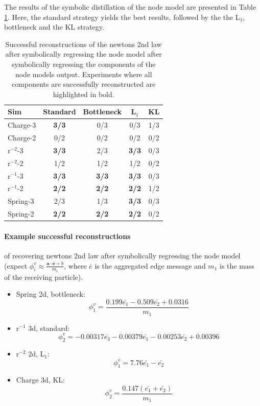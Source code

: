 \documentclass[11pt]{article}
\begin{document}
    The results of the symbolic distillation of the node model are presented in Table \ref{tab:sr_edge_model_table}. Here, the standard strategy yields the best results, followed by the the L$_1$, bottleneck and the KL strategy.
    \begin{table}[H]
        \centering
        \begin{tabular}{lcccc}
        \hline
        Sim & Standard & Bottleneck & L$_1$ & KL \\
        \hline
        Charge-3 & \textbf{3/3} & 0/3 & 0/3 & 1/3 \\
        Charge-2 & 0/2 & 0/2 & 0/2 & 0/2 \\
        r$^{-2}$-3 & \textbf{3/3} & 2/3 & \textbf{3/3} & 0/3 \\
        r$^{-2}$-2 & 1/2 & 1/2 & 1/2 & 0/2 \\
        r$^{-1}$-3 & \textbf{3/3} & \textbf{3/3} & \textbf{3/3} & 0/3 \\
        r$^{-1}$-2 & \textbf{2/2} & \textbf{2/2} & \textbf{2/2} & 1/2 \\
        Spring-3 & 2/3 & 1/3 & \textbf{3/3}  & 0/3 \\
        Spring-2 & \textbf{2/2} & \textbf{2/2} & \textbf{2/2} & 0/2 \\
        \hline
        \end{tabular}
        \caption{Successful reconstructions of the newtons 2nd law after symbolically regressing the node model after symbolically regressing the components of the node models output. Experiments where all components are successfully reconstructed are highlighted in bold.}
        \label{tab:sr_edge_model_table}
    \end{table}


\paragraph*{Example successful reconstructions} of recovering newtons 2nd law after symbolically regressing the node model (expect $\phi^{v}_i \approx \frac{\mathbf{a} \cdot \mathbf{\bar{e}} + b}{m_1}$, where $\bar{e}$ is the aggregated edge message and $m_1$ is the mass of the receiving particle).
\begin{itemize}
        \item
        Spring 2d, bottleneck:
        $$
        \phi^{v}_1 = \frac{0.199\bar{e_1} - 0.509\bar{e_2} + 0.0316}{m_1}$$
        \item
        r$^{-1}$ 3d, standard:
        $$
        \phi^{v}_2 = -0.00317\bar{e_3} - 0.00379\bar{e_1} - 0.00253\bar{e_2} + 0.00396
        $$
        \item
        r$^{-2}$ 2d, L$_1$:
        $$
        \phi^{v}_1 = 7.76\bar{e_1} - \bar{e_2}
        $$
        \item
        Charge 3d, KL:
        $$
        \phi^{v}_2 = \frac{0.147(\bar{e_1} + \bar{e_2})}{m_1}
        $$
    \end{itemize}
\end{document}
